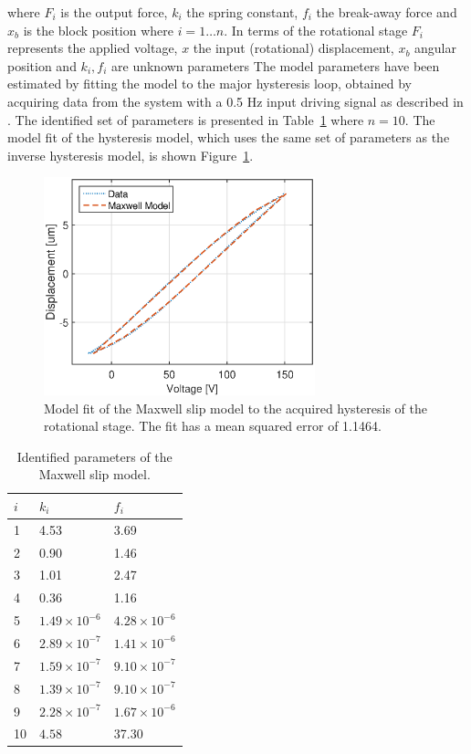where $F_i$ is the output force, $k_i$ the spring constant, $f_i$ the break-away force and $x_b$ is the block position where $i=1 \hdots n$. In terms of the rotational stage $F_i$ represents the applied voltage, $x$ the input (rotational) displacement, $x_b$ angular position and $k_i, f_i$ are unknown parameters
The model parameters have been estimated by fitting the model to the major hysteresis loop, obtained by acquiring data from the system with a 0.5 Hz input driving signal as described in \citep{ButcherIdentification:2015,ButcherController:2015}. The identified set of parameters is presented in Table~\ref{tab:maxwell} where $n=10$. The model fit of the hysteresis model, which uses the same set of parameters as the inverse hysteresis model, is shown Figure~\ref{fig:maxwell}.

\begin{figure}[h]
  \centering
  \includegraphics[width=0.7\textwidth]{fig/matlab/maxwell.eps}
  \caption{\label{fig:maxwell} Model fit of the Maxwell slip model to the acquired hysteresis of the rotational stage. The fit has a mean squared error of 1.1464.}
\end{figure}

\begin{table}[h!]
  \centering
  \begin{tabular}{| l | l | l |}
    \hline
    $i$ & $k_i$ & $f_i$ \\ \hline
    1 & 4.53 & 3.69 \\
    2 & 0.90 & 1.46 \\
    3 & 1.01 & 2.47 \\
    4 & 0.36 & 1.16 \\
    5 & $1.49 \times 10^{-6}$ & $4.28 \times 10^{-6}$ \\
    6 & $2.89 \times 10^{-7}$ & $1.41 \times 10^{-6}$ \\
    7 & $1.59 \times 10^{-7}$ & $9.10 \times 10^{-7}$ \\
    8 & $1.39 \times 10^{-7}$ & $9.10 \times 10^{-7}$ \\
    9 & $2.28 \times 10^{-7}$ & $1.67 \times 10^{-6}$ \\
    10 & $4.58$ & 37.30 \\
    \hline
  \end{tabular}
  \caption{\label{tab:maxwell} Identified parameters of the Maxwell slip model.}
\end{table}

